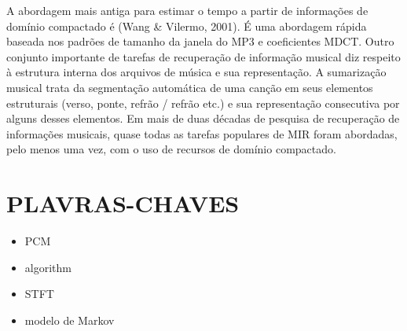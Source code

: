\documentclass{article}
\begin{document}
A abordagem mais antiga para estimar o tempo a partir de informações de domínio compactado é (Wang & Vilermo, 2001). É uma abordagem rápida baseada nos padrões de tamanho da janela do MP3 e coeficientes MDCT. Outro conjunto importante de tarefas de recuperação de informação musical diz respeito à estrutura interna dos arquivos de música e sua representação. A sumarização musical trata da segmentação automática de uma canção em seus elementos estruturais (verso, ponte, refrão / refrão etc.) e sua representação consecutiva por alguns desses elementos.
Em mais de duas décadas de pesquisa de recuperação de informações musicais, quase todas as tarefas populares de MIR foram abordadas, pelo menos uma vez, com o uso de recursos de domínio compactado.
\section{PLAVRAS-CHAVES}
\begin{itemize}
    \item PCM
    \item <Min-Max, PARC> algorithm
    \item STFT
    \item modelo de Markov
\end{itemize}
\end{document}
